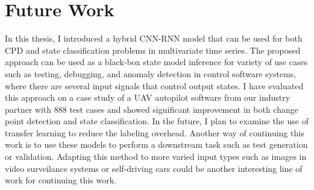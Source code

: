 \chapter{Future Work}\label{sec:future_work}
In this thesis, I introduced a hybrid CNN-RNN model that can be used for both CPD and state classification problems in multivariate time series. The proposed approach can be used as a black-box state model inference for variety of use cases such as testing, debugging, and anomaly detection in control software systems, where there are several input signals that control output states. I have evaluated this approach on a case study of a UAV autopilot software from our industry partner with 888 test cases and showed significant improvement in both change point detection and state classification. In the future, I plan to examine the use of transfer learning to reduce the labeling overhead. Another way of continuing this work is to use these models to perform a downstream task such as test generation or validation. Adapting this method to more varied input types such as images in video surveilance systems or self-driving cars could be another interesting line of work for continuing this work.
